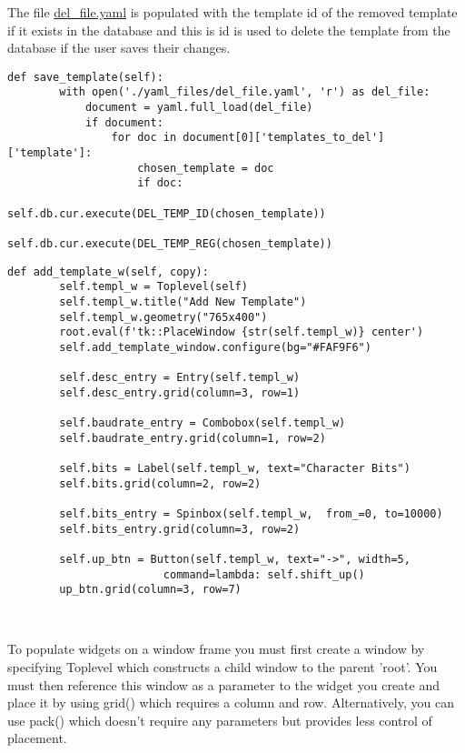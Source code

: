 \documentclass[a4paper,12pt, notitlepage]{article}
\begin{document}
The file \url{del_file.yaml} is populated with the template id of the removed template if it exists in the database and this is id is used to delete the template from the database if the user saves their changes.

\newpage
\begin{lstlisting}[caption={The process of deleting a template from the database.},label={lst: exampDelTemp}]
    def save_template(self):
        with open('./yaml_files/del_file.yaml', 'r') as del_file:
            document = yaml.full_load(del_file)
            if document:
                for doc in document[0]['templates_to_del']['template']:
                    chosen_template = doc
                    if doc:
                        self.db.cur.execute(DEL_TEMP_ID(chosen_template))
                        self.db.cur.execute(DEL_TEMP_REG(chosen_template))
\end{lstlisting}

\begin{lstlisting}[caption={An example of creating a window with a range of widgets suppled by Tkinter"},label={lst: exampAddTmp}]
    def add_template_w(self, copy):
        self.templ_w = Toplevel(self)
        self.templ_w.title("Add New Template")
        self.templ_w.geometry("765x400")
        root.eval(f'tk::PlaceWindow {str(self.templ_w)} center')
        self.add_template_window.configure(bg="#FAF9F6")

        self.desc_entry = Entry(self.templ_w)
        self.desc_entry.grid(column=3, row=1)

        self.baudrate_entry = Combobox(self.templ_w)
        self.baudrate_entry.grid(column=1, row=2)

        self.bits = Label(self.templ_w, text="Character Bits")
        self.bits.grid(column=2, row=2)

        self.bits_entry = Spinbox(self.templ_w,  from_=0, to=10000)
        self.bits_entry.grid(column=3, row=2)
        
        self.up_btn = Button(self.templ_w, text="->", width=5,
                        command=lambda: self.shift_up()
        up_btn.grid(column=3, row=7)
        
        
\end{lstlisting}

To populate widgets on a window frame you must first create a window by specifying Toplevel which constructs a child window to the parent 'root'. You must then reference this window as a parameter to the widget you create and place it by using grid() which requires a column and row. Alternatively, you can use pack() which doesn't require any parameters but provides less control of placement.
\end{document}
